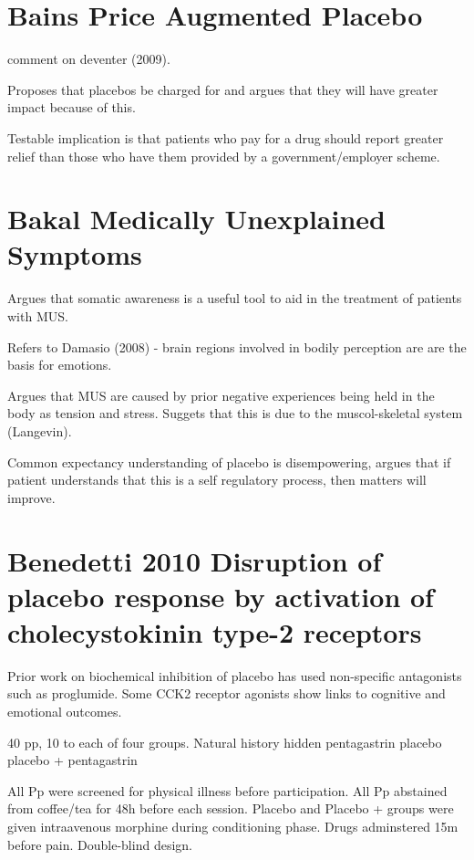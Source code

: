 \documentclass{article}
\begin{document}
\section{Bains Price Augmented Placebo}
\label{sec:bains-price-augm}

comment on deventer (2009).

Proposes that placebos be charged for and argues that they will have greater impact because of this.

Testable implication is that patients who pay for a drug should report greater relief than those who have them provided by a government/employer scheme. 

\section{Bakal Medically Unexplained Symptoms}
\label{sec:bakal-medic-unexpl}

Argues that somatic awareness is a useful tool to aid in the treatment of patients with MUS. 

Refers to Damasio (2008) - brain regions involved in bodily perception are are the basis for emotions. 

Argues that MUS are caused by prior negative experiences being held in the body as tension and stress. Suggets that this is due to the muscol-skeletal system (Langevin). 

Common expectancy understanding of placebo is disempowering, argues that if patient understands that this is a self regulatory process, then matters will improve. 

\section{Benedetti 2010 Disruption of placebo response by activation of cholecystokinin type-2 receptors}
\label{sec:bened-2010-disr}

Prior work on biochemical inhibition of placebo has used non-specific antagonists such as proglumide. Some CCK2 receptor agonists show links to cognitive and emotional outcomes.  

40 pp, 10 to each of four groups. 
Natural history
hidden pentagastrin
placebo
placebo + pentagastrin

All Pp were screened for physical illness before participation. 
All Pp abstained from coffee/tea for 48h before each session.
Placebo and Placebo + groups were given intraavenous morphine during conditioning phase. 
Drugs adminstered 15m before pain.
Double-blind design. 
\end{document}
